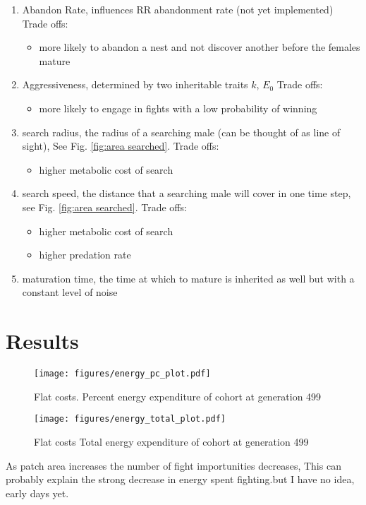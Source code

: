 \documentclass[a4paper,11pt]{article}
\begin{document}
\begin{enumerate}
    \item Abandon Rate, influences RR abandonment rate (not yet implemented)
    Trade offs:
    \begin{itemize}
        \item more likely to abandon a nest and not discover another before the females mature
    \end{itemize}

    \item Aggressiveness, determined by two inheritable traits $k$, $E_0$
    Trade offs:
    \begin{itemize}
        \item more likely to engage in fights with a low probability of winning
    \end{itemize}
    
    \item search radius, the radius of a searching male (can be thought of as line of sight), See Fig. \ref{fig:area searched}.
    Trade offs:
    \begin{itemize}
        \item higher metabolic cost of search
    \end{itemize}

    \item search speed, the distance that a searching male will cover in one time step, see Fig. \ref{fig:area searched}.
    Trade offs:
        \begin{itemize}
            \item higher metabolic cost of search
            \item higher predation rate
        \end{itemize}
    \item maturation time, the time at which to mature is inherited as well but with a constant level of noise
\end{enumerate}

\clearpage

\section{Results} %
\label{sec:results}

\begin{figure}[h!]
    \centering
    \texttt{[image: figures/energy\_pc\_plot.pdf]}
    \caption{Flat costs. Percent energy expenditure of cohort at generation 499}
    \label{fig:energy pc}

    \centering
    \texttt{[image: figures/energy\_total\_plot.pdf]}
    \caption{ Flat costs Total energy expenditure of cohort at generation 499}
    \label{fig:energy total}
\end{figure}
As patch area increases the number of fight importunities decreases,
This can probably explain the strong decrease in energy spent fighting.but I have no idea, early days yet.
\clearpage
\end{document}
